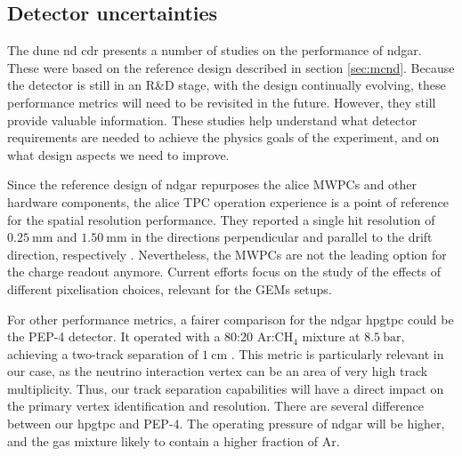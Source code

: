 \subsection{Detector uncertainties}

The \gls{dune} \gls{nd} \gls{cdr} \cite{DUNE2021NDCDR} presents a number of studies on the performance of \gls{ndgar}. These were based on the reference design described in section \ref{sec:mcnd}. Because the detector is still in an R\&D stage, with the design continually evolving, these performance metrics will need to be revisited in the future. However, they still provide valuable information. These studies help understand what detector requirements are needed to achieve the physics goals of the experiment, and on what design aspects we need to improve.

Since the reference design of \gls{ndgar} repurposes the \gls{alice} MWPCs and other hardware components, the \gls{alice} TPC operation experience is a point of reference for the spatial resolution performance. They reported a single hit resolution of $0.25~\mathrm{mm}$ and $1.50~\mathrm{mm}$ in the directions perpendicular and parallel to the drift direction, respectively \cite{ALICE2006}. Nevertheless, the MWPCs are not the leading option for the charge readout anymore. Current efforts focus on the study of the effects of different pixelisation choices, relevant for the GEMs setups.

For other performance metrics, a fairer comparison for the \gls{ndgar} \gls{hpgtpc} could be the PEP-4 detector. It operated with a 80:20 $\mathrm{Ar}$:$\mathrm{CH}_{4}$ mixture at $8.5~\mathrm{bar}$, achieving a two-track separation of $1~\mathrm{cm}$ \cite{Stork1982,Aihara1983}. This metric is particularly relevant in our case, as the neutrino interaction vertex can be an area of very high track multiplicity. Thus, our track separation capabilities will have a direct impact on the primary vertex identification and resolution. There are several difference between our \gls{hpgtpc} and PEP-4. The operating pressure of \gls{ndgar} will be higher, and the gas mixture likely to contain a higher fraction of Ar.

